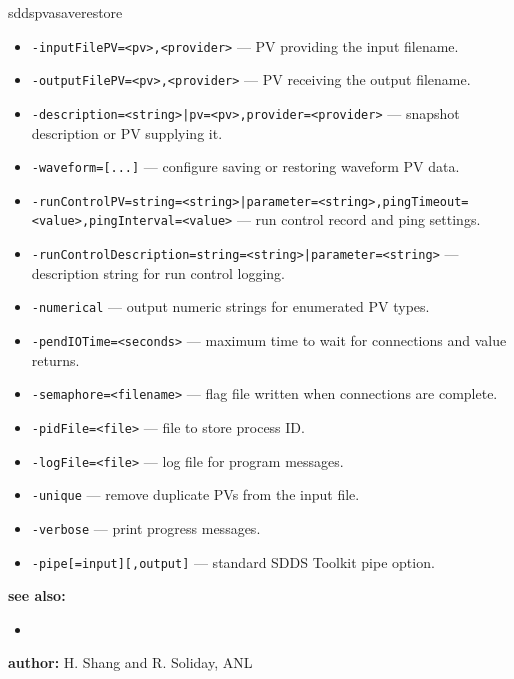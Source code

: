 \begin{sddsprog}{sddspvasaverestore}
\begin{itemize}
  \item {\tt -inputFilePV=<pv>,<provider>} --- PV providing the input filename.
  \item {\tt -outputFilePV=<pv>,<provider>} --- PV receiving the output filename.
  \item {\tt -description=<string>|pv=<pv>,provider=<provider>} --- snapshot description or PV supplying it.
  \item {\tt -waveform=[...]} --- configure saving or restoring waveform PV data.
  \item {\tt -runControlPV={string=<string>|parameter=<string>},pingTimeout=<value>,pingInterval=<value>} --- run control record and ping settings.
  \item {\tt -runControlDescription={string=<string>|parameter=<string>}} --- description string for run control logging.
  \item {\tt -numerical} --- output numeric strings for enumerated PV types.
  \item {\tt -pendIOTime=<seconds>} --- maximum time to wait for connections and value returns.
  \item {\tt -semaphore=<filename>} --- flag file written when connections are complete.
  \item {\tt -pidFile=<file>} --- file to store process ID.
  \item {\tt -logFile=<file>} --- log file for program messages.
  \item {\tt -unique} --- remove duplicate PVs from the input file.
  \item {\tt -verbose} --- print progress messages.
  \item {\tt -pipe[=input][,output]} --- standard SDDS Toolkit pipe option.
  \end{itemize}
\item \textbf{see also:}
  \begin{itemize}
  \item {}
  \end{itemize}
\item \textbf{author:} H. Shang and R. Soliday, ANL
\end{sddsprog}
